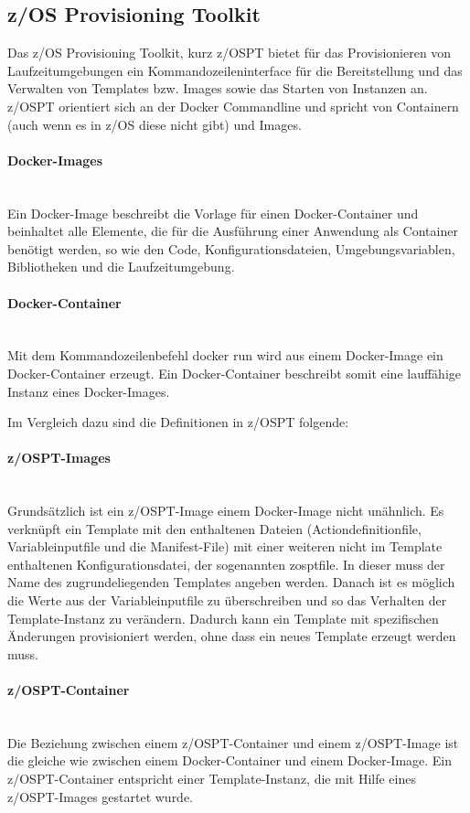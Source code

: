 \subsection{z/OS Provisioning Toolkit}\label{sssec:zospt}
Das z/OS Provisioning Toolkit, kurz z/OSPT bietet für das Provisionieren von Laufzeitumgebungen ein Kommandozeileninterface für die Bereitstellung und das Verwalten von Templates bzw. \glqq Images\grqq{} sowie das Starten von Instanzen an. 
z/OSPT orientiert sich an der Docker Commandline und spricht von Containern (auch wenn es in z/OS diese nicht gibt) und Images.
\paragraph{\glqq Docker-Images\grqq}~\\
Ein Docker-Image beschreibt die Vorlage für einen Docker-Container und beinhaltet alle Elemente, die für die Ausführung einer Anwendung als Container benötigt werden, so wie den Code, Konfigurationsdateien, Umgebungsvariablen, Bibliotheken und die Laufzeitumgebung.

\paragraph{\glqq Docker-Container\grqq}~\\
Mit dem Kommandozeilenbefehl \glqq docker run\grqq{} wird aus einem Docker-Image ein Docker-Container erzeugt.
Ein Docker-Container beschreibt somit eine lauffähige Instanz eines Docker-Images.
\cite{Vohra.2016}

Im Vergleich dazu sind die Definitionen in z/OSPT folgende:
\paragraph{\glqq z/OSPT-Images\grqq}~\\
Grundsätzlich ist ein z/OSPT-Image einem Docker-Image nicht unähnlich.
Es verknüpft ein Template mit den enthaltenen Dateien (Actiondefinitionfile, Variableinputfile und die Manifest-File) mit einer weiteren nicht im Template enthaltenen Konfigurationsdatei, der sogenannten \glqq zosptfile\grqq.
In dieser muss der Name des zugrundeliegenden Templates angeben werden.
Danach ist es möglich die Werte aus der Variableinputfile zu überschreiben und so das Verhalten der Template-Instanz zu verändern.
Dadurch kann ein Template mit spezifischen Änderungen provisioniert werden, ohne dass ein neues Template erzeugt werden muss.

\paragraph{\glqq z/OSPT-Container\grqq}~\\
Die Beziehung zwischen einem z/OSPT-Container und einem z/OSPT-Image ist die gleiche wie zwischen einem Docker-Container und einem Docker-Image.
Ein z/OSPT-Container entspricht einer Template-Instanz, die mit Hilfe eines z/OSPT-Images gestartet wurde.


